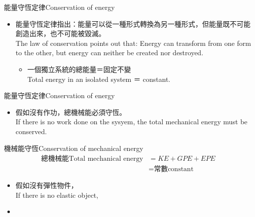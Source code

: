\documentclass[beamer=true]{standalone}
\begin{document}
\begin{frame}{能量守恆定律Conservation of energy}
    \begin{itemize}
        \item 能量守恆定律指出：能量可以從一種形式轉換為另一種形式，但能量既不可能創造出來，也不可能被毀滅。\\The law of conservation points out that: Energy can transform from one form to the other, but energy can neither be created nor destroyed.
              \begin{itemize}
                  \item 一個獨立系統的總能量＝固定不變\\Total energy in an isolated system ＝ constant.
              \end{itemize}
    \end{itemize}
\end{frame}

\begin{frame}{能量守恆定律Conservation of energy}
    \begin{itemize}
        \item 假如沒有作功，總機械能必須守恆。\\If there is no work done on the sysyem, the total mechanical energy must be conserved.
    \end{itemize}
    \begin{exampleblock}
        {機械能守恆Conservation of mechanical energy}
        \begin{align*}
            \textrm{總機械能Total mechanical energy} & =KE+GPE+EPE          \\
                                                 & =\textrm{常數constant}
        \end{align*}
    \end{exampleblock}
    \begin{itemize}
        \item 假如沒有彈性物件，\\If there is no elastic object,
        \item[] 
    \end{itemize}
\end{frame}
\end{document}
